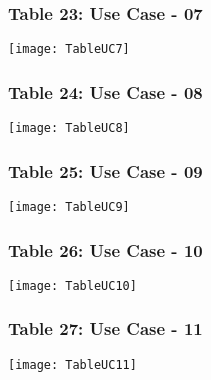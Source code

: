 \begin{figure}[ht]
\subsubsection{Table 23: Use Case - 07}
\centering
\texttt{[image: TableUC7]}
\end{figure}

\begin{figure}[ht]
\subsubsection{Table 24: Use Case - 08}
\centering
\texttt{[image: TableUC8]}
\end{figure}

\begin{figure}[ht]
\subsubsection{Table 25: Use Case - 09}
\centering
\texttt{[image: TableUC9]}
\end{figure}

\begin{figure}[ht]
\subsubsection{Table 26: Use Case - 10}
\centering
\texttt{[image: TableUC10]}
\end{figure}

\begin{figure}[ht]
\subsubsection{Table 27: Use Case - 11}
\centering
\texttt{[image: TableUC11]}
\end{figure}
 

